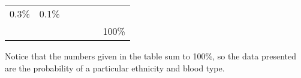 \documentclass[]{book}
\begin{document}
\begin{enumerate}
\begin{longtable}[]{@{}llllll@{}}
\begin{minipage}[t]{0.10\columnwidth}
  0.3\%\strut
  \end{minipage} &
  \begin{minipage}[t]{0.10\columnwidth}\raggedright\strut
  0.1\%\strut
  \end{minipage} &
  \begin{minipage}[t]{0.10\columnwidth}\raggedright\strut
  \(\,\)\strut
  \end{minipage}\tabularnewline
  \begin{minipage}[t]{0.15\columnwidth}\raggedright\strut
  \(\,\)\strut
  \end{minipage} &
  \begin{minipage}[t]{0.10\columnwidth}\raggedright\strut
  \(\,\)\strut
  \end{minipage} &
  \begin{minipage}[t]{0.12\columnwidth}\raggedright\strut
  \(\,\)\strut
  \end{minipage} &
  \begin{minipage}[t]{0.10\columnwidth}\raggedright\strut
  \(\,\)\strut
  \end{minipage} &
  \begin{minipage}[t]{0.10\columnwidth}\raggedright\strut
  \(\,\)\strut
  \end{minipage} &
  \begin{minipage}[t]{0.10\columnwidth}\raggedright\strut
  100\%\strut
  \end{minipage}\tabularnewline
  \bottomrule
  \end{longtable}

  Notice that the numbers given in the table sum to 100\%, so the data
  presented are the probability of a particular ethnicity and blood
  type.


\end{enumerate}
\end{document}
